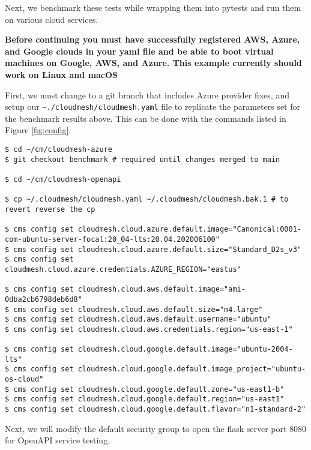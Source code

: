 Next, we benchmark these tests while wrapping them into pytests and run
them on various cloud services.

\textbf{Before continuing you must have successfully registered AWS,
Azure, and Google clouds in your yaml file and be able to boot virtual
machines on Google, AWS, and Azure. This example currently should work
on Linux and macOS}

First, we must change to a git branch that includes Azure provider
fixes, and setup our \verb|~./cloudmesh/cloudmesh.yaml| file to
replicate the parameters set for the benchmark results above. This can
be done with the commands listed in Figure \ref{fig:config}.


\begin{figure*}[htb]

\begin{verbatim}
$ cd ~/cm/cloudmesh-azure 
$ git checkout benchmark # required until changes merged to main

$ cd ~/cm/cloudmesh-openapi

$ cp ~/.cloudmesh/cloudmesh.yaml ~/.cloudmesh/cloudmesh.bak.1 # to revert reverse the cp

$ cms config set cloudmesh.cloud.azure.default.image="Canonical:0001-com-ubuntu-server-focal:20_04-lts:20.04.202006100"
$ cms config set cloudmesh.cloud.azure.default.size="Standard_D2s_v3"
$ cms config set cloudmesh.cloud.azure.credentials.AZURE_REGION="eastus"

$ cms config set cloudmesh.cloud.aws.default.image="ami-0dba2cb6798deb6d8"
$ cms config set cloudmesh.cloud.aws.default.size="m4.large"
$ cms config set cloudmesh.cloud.aws.default.username="ubuntu"
$ cms config set cloudmesh.cloud.aws.credentials.region="us-east-1"

$ cms config set cloudmesh.cloud.google.default.image="ubuntu-2004-lts"
$ cms config set cloudmesh.cloud.google.default.image_project="ubuntu-os-cloud"
$ cms config set cloudmesh.cloud.google.default.zone="us-east1-b"
$ cms config set cloudmesh.cloud.google.default.region="us-east1"
$ cms config set cloudmesh.cloud.google.default.flavor="n1-standard-2"
\end{verbatim}

  \caption{Configuration}
  \label{fig:config}
  \end{figure*}

Next, we will modify the default security group to open the flask server
port 8080 for OpenAPI service testing.

